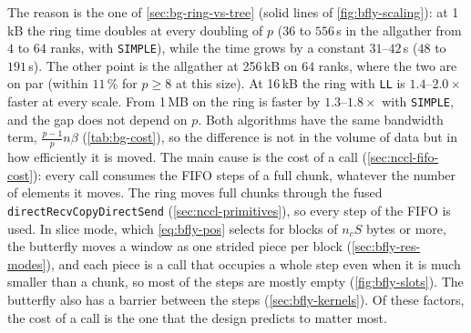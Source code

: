The reason is the one of \cref{sec:bg-ring-vs-tree} (solid lines of \cref{fig:bfly-scaling}): at 1\,kB the ring time doubles at every doubling of $p$ ($36$ to $556$\,\textmu s in the allgather from $4$ to $64$ ranks, with \texttt{SIMPLE}), while the \bine{} time grows by a constant $31$--$42$\,\textmu s ($48$ to $191$\,\textmu s).
The other point is the allgather at 256\,kB on $64$ ranks, where the two are on par (within $11\,\%$ for $p\ge8$ at this size).
At 16\,kB the ring with \texttt{LL} is $1.4$--$2.0\times$ faster at every scale.
From 1\,MB on the ring is faster by $1.3$--$1.8\times$ with \texttt{SIMPLE}, and the gap does not depend on $p$.
Both algorithms have the same bandwidth term, $\tfrac{p-1}{p}n\beta$ (\cref{tab:bg-cost}), so the difference is not in the volume of data but in how efficiently it is moved.
The main cause is the cost of a call (\cref{sec:nccl-fifo-cost}): every call consumes the FIFO steps of a full chunk, whatever the number of elements it moves.
The ring moves full chunks through the fused \texttt{directRecvCopyDirectSend} (\cref{sec:nccl-primitives}), so every step of the FIFO is used.
In slice mode, which \cref{eq:bfly-pos} selects for blocks of $n_cS$ bytes or more, the butterfly moves a window as one strided piece per block (\cref{sec:bfly-res-modes}), and each piece is a call that occupies a whole step even when it is much smaller than a chunk, so most of the steps are mostly empty (\cref{fig:bfly-slots}).
The butterfly also has a barrier between the steps (\cref{sec:bfly-kernels}).
Of these factors, the cost of a call is the one that the design predicts to matter most.

